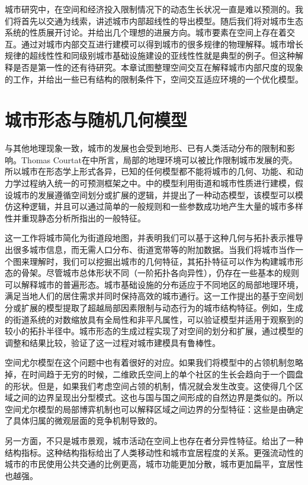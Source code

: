 城市研究中，在空间和经济投入限制情况下的动态生长状况一直是难以预测的。我们将首先以交通为线索，讲述城市内部超线性的导出模型。随后我们将对城市生态系统的性质展开讨论。并给出几个理想的进展方向。城市要素在空间上存在着交互。通过对城市内部交互进行建模可以得到城市的很多规律的物理解释。城市增长规律的超线性性和同级别城市基础设施建设的亚线性性就是典型的例子。但这种解释是否是第一性的还有待研究。本章试图整理空间交互在解释城市内部尺度的现象的工作，并给出一些已有结构的限制条件下，空间交互适应环境的一个优化模型。

\section{城市形态与随机几何模型}

与其他地理现象一致，城市的发展也会受到地形、已有人类活动分布的限制和影响。Thomas Courtat在\cite{Courtat2011}中所言，局部的地理环境可以被比作限制城市发展的壳。所以城市在形态学上形式各异，已知的任何模型都不能将城市的几何、功能、和动力学过程纳入统一的可预测框架之中。\cite{Courtat2011}中的模型利用街道和城市性质进行建模，假设城市的发展遵循空间划分或扩展的逻辑，并提出了一种动态模型，该模型可以模仿这种逻辑，并且可以通过简单的一般规则和一些参数成功地产生大量的城市多样性并重现静态分析所指出的一般特征。

这一工作将城市简化为街道段地图，并表明我们可以基于这种几何与拓扑表示推导出很多城市信息，而无需人口分布、街道宽带等的附加数据。当我们将城市当作一个图来理解时，我们可以挖掘出城市的几何特征，其拓扑特征可以作为构建城市形态的骨架。尽管城市总体形状不同（一阶拓扑各向异性），仍存在一些基本的规则可以解释城市的普遍形态。城市基础设施的分布适应于不同地区的局部地理环境，满足当地人们的居住需求并同时保持高效的城市通行。这一工作提出的基于空间划分或扩展的模型提取了超越局部因素限制与动态行为的城市结构特征。例如，生成的街道系统的对数缩放具有全局性和非平凡属性，可以验证模型并适用于观察到的较小的拓扑半径中。城市形态的生成过程实现了对空间的划分和扩展，通过模型的调整和结果比较，验证了这一过程对城市建模具有鲁棒性。

空间尤尔模型在这个问题中也有着很好的对应。如果我们将模型中的占领机制忽略掉，在时间趋于无穷的时候，二维欧氏空间上的单个社区的生长会趋向于一个圆盘的形状。但是，如果我们考虑空间占领的机制，情况就会发生改变。这使得几个区域之间的边界呈现出分型模式。这也与国与国之间形成的自然边界是类似的。所以空间尤尔模型的局部博弈机制也可以解释区域之间边界的分型特征：这些是由确定了具体归属的微观层面的竞争机制导致的。

另一方面，不只是城市景观，城市活动在空间上也存在者分异性特征。\cite{hierarchicalorganization}给出了一种结构指标。这种结构指标给出了人类移动性和城市宜居程度的关系。更强流动性的城市的市民使用公共交通的比例更高，城市功能更加分散，城市更加扁平，宜居性也越强。

